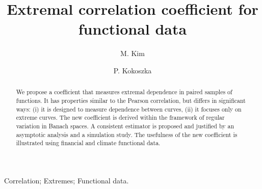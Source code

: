 \documentclass[lineno]{biometrika}
\begin{document}



\title{Extremal correlation coefficient for functional data}

\author{M. Kim}

\author{P. Kokoszka}



\maketitle

\begin{abstract}
We propose a coefficient that measures extremal dependence in
paired samples of functions. It has properties similar to the
Pearson correlation,  but  differs in significant ways:
(i) it is designed to measure dependence between curves, (ii)
it focuses only on extreme curves. The new coefficient is derived
within the framework of regular variation in Banach
spaces. A consistent estimator is proposed and justified
by an asymptotic analysis and a simulation study.
The usefulness of the new coefficient is illustrated using
financial and climate functional data.
\end{abstract}

\begin{keywords}
Correlation; Extremes; Functional data.
\end{keywords}
\end{document}
